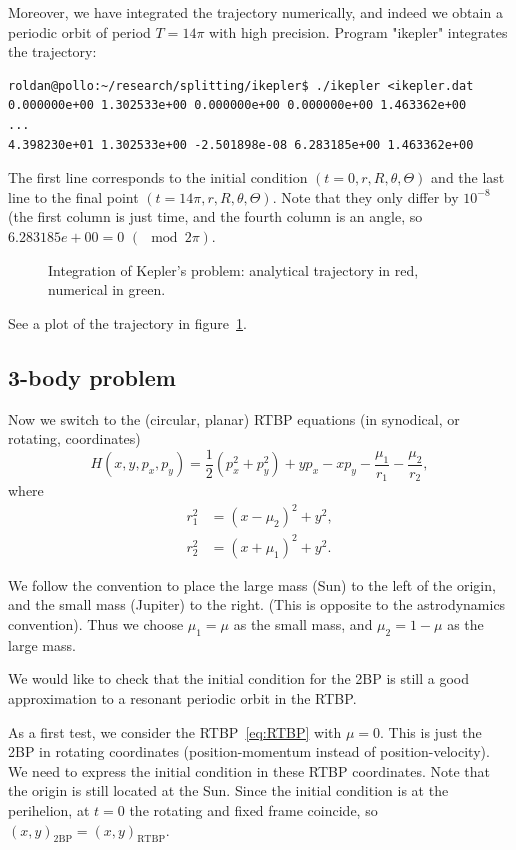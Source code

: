 \documentclass[a4paper]{amsart}
\theoremstyle{remark}
\begin{document}
Moreover, we have integrated the trajectory numerically, and indeed we obtain
a periodic orbit of period $T=14\pi$ with high precision. Program "ikepler"
integrates the trajectory:

\begin{verbatim}
roldan@pollo:~/research/splitting/ikepler$ ./ikepler <ikepler.dat
0.000000e+00 1.302533e+00 0.000000e+00 0.000000e+00 1.463362e+00
...
4.398230e+01 1.302533e+00 -2.501898e-08 6.283185e+00 1.463362e+00
\end{verbatim}
The first line corresponds to the initial condition $(t=0,r,R,\theta,\Theta)$
and the last line to the final point $(t=14\pi,r,R,\theta,\Theta)$. Note that
they only differ by $10^{-8}$ (the first column is just time, and the fourth
column is an angle, so $6.283185e+00=0$ $(\mod 2\pi)$.

\begin{figure}[!htbp]
\caption{Integration of Kepler's problem: analytical trajectory in red,
numerical in green.}
\label{fig:ikepler}
\end{figure}

See a plot of the trajectory in figure~\ref{fig:ikepler}.

\subsection{3-body problem}

Now we switch to the (circular, planar) RTBP equations (in synodical, or
rotating, coordinates)
\begin{equation}\label{eq:RTBP}
H(x,y,p_x,p_y)=
\frac{1}{2}(p_x^2+p_y^2)+yp_x-xp_y-\frac{\mu_1}{r_1}-\frac{\mu_2}{r_2},
\end{equation}
where 
\begin{align*}
r_1^2 &= (x-\mu_2)^2 + y^2, \\
r_2^2 &= (x+\mu_1)^2 + y^2.
\end{align*}

We follow the convention to place the large mass (Sun) to the left of
the origin, and the small mass (Jupiter) to the right.
(This is opposite to the astrodynamics convention).
Thus we choose $\mu_1=\mu$ as the small mass, and $\mu_2=1-\mu$ as the
large mass.

We would like to check that the initial condition for the 2BP is still a good
approximation to a resonant periodic orbit in the RTBP. 

As a first test, we consider the RTBP~\eqref{eq:RTBP} with $\mu=0$. This is
just the 2BP in rotating coordinates (position-momentum instead of
position-velocity). We need to express the initial condition in these RTBP
coordinates. Note that the origin is still located at the Sun. Since the
initial condition is at the perihelion, at $t=0$ the rotating and fixed frame
coincide, so ${(x,y)}_{\mathrm{2BP}}={(x,y)}_{\mathrm{RTBP}}$. 
\end{document}
